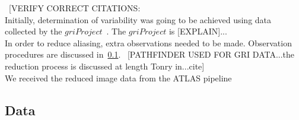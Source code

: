 \documentclass[aps,prb,twocolumn,superscriptaddress]{revtex4-1}
\begin{document}
~[VERIFY CORRECT CITATIONS:\\%
Initially, determination of variability was going to be achieved using data collected by the $gri Project$~\cite{gri}.  The $gri Project$ is [EXPLAIN]...\\
In order to reduce aliasing, extra observations needed to be made.  Observation procedures are discussed in~\cref{sec:data}.
~[PATHFINDER USED FOR GRI DATA...the reduction process is discussed at length Tonry in...cite]\\
We received the reduced image data from the ATLAS pipeline~\cite{PSpipe}~\cite{tonrypipe}


\subsection{Data}\label{sec:data}

\end{document}
